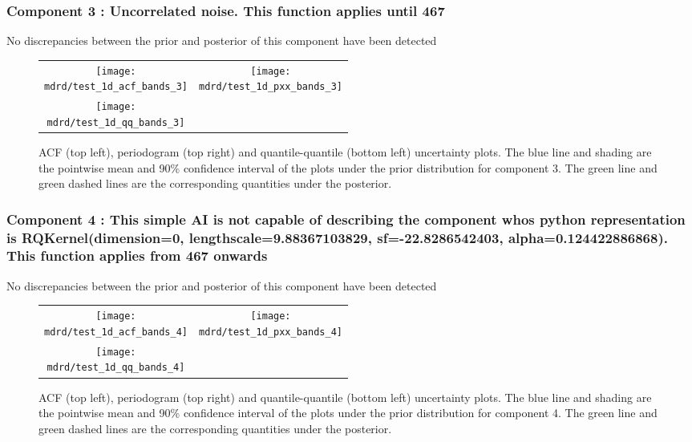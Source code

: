 \documentclass{article} %
\begin{document}
\subsubsection{Component 3 : Uncorrelated noise. This function applies until  467}

No discrepancies between the prior and posterior of this component have been detected

\begin{figure}[H]
\newcommand{\wmgd}{0.5\columnwidth}
\newcommand{\hmgd}{3.0cm}
\newcommand{\mdrd}{test_1d}
\newcommand{\mbm}{\hspace{-0.3cm}}
\begin{tabular}{cc}
\mbm \texttt{[image: \\mdrd/test\_1d\_acf\_bands\_3]} & \texttt{[image: \\mdrd/test\_1d\_pxx\_bands\_3]} \\
\mbm \texttt{[image: \\mdrd/test\_1d\_qq\_bands\_3]}
\end{tabular}
\caption{
ACF (top left), periodogram (top right) and quantile-quantile (bottom left) uncertainty plots.
The blue line and shading are the pointwise mean and 90\% confidence interval of the plots under the prior distribution for component 3.
The green line and green dashed lines are the corresponding quantities under the posterior.}
\label{fig:check3}
\end{figure}

\subsubsection{Component 4 : This simple AI is not capable of describing the component whos python representation is RQKernel(dimension=0, lengthscale=9.88367103829, sf=-22.8286542403, alpha=0.124422886868). This function applies from  467 onwards}

No discrepancies between the prior and posterior of this component have been detected

\begin{figure}[H]
\newcommand{\wmgd}{0.5\columnwidth}
\newcommand{\hmgd}{3.0cm}
\newcommand{\mdrd}{test_1d}
\newcommand{\mbm}{\hspace{-0.3cm}}
\begin{tabular}{cc}
\mbm \texttt{[image: \\mdrd/test\_1d\_acf\_bands\_4]} & \texttt{[image: \\mdrd/test\_1d\_pxx\_bands\_4]} \\
\mbm \texttt{[image: \\mdrd/test\_1d\_qq\_bands\_4]}
\end{tabular}
\caption{
ACF (top left), periodogram (top right) and quantile-quantile (bottom left) uncertainty plots.
The blue line and shading are the pointwise mean and 90\% confidence interval of the plots under the prior distribution for component 4.
The green line and green dashed lines are the corresponding quantities under the posterior.}
\label{fig:check4}
\end{figure}
\end{document}
